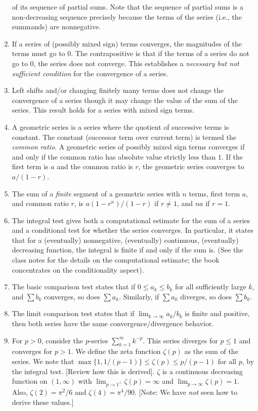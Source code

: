 \documentclass{amsart}
\begin{document}
\begin{enumerate}
  of its sequence of partial sums. Note that the sequence of partial
  sums is a non-decreasing sequence precisely because the terms of the
  series (i.e., the summands) are nonnegative.
\item If a series of (possibly mixed sign) terms converges, the
  magnitudes of the terms must go to $0$. The contrapositive is that
  if the terms of a series do not go to $0$, the series does not
  converge. This establishes a {\em necessary but not sufficient
  condition} for the convergence of a series.
\item Left shifts and/or changing finitely many terms does not change
  the convergence of a series though it may change the value of the
  sum of the series. This result holds for a series with mixed sign
  terms.
\item A geometric series is a series where the quotient of successive
  terms is constant. The constant (successor term over current term)
  is termed the {\em common ratio}. A geometric series of possibly
  mixed sign terms converges if and only if the common ratio has
  absolute value strictly less than $1$. If the first term is $a$ and
  the common ratio is $r$, the geometric series converges to $a/(1 -
  r)$.
\item The sum of a {\em finite} segment of a geometric series with $n$
  terms, first term $a$, and common ratio $r$, is $a(1 - r^n)/(1 - r)$
  if $r \ne 1$, and $na$ if $r = 1$.
\item The integral test gives both a computational estimate for the
  sum of a series and a conditional test for whether the series
  converges. In particular, it states that for a (eventually)
  nonnegative, (eventually) continuous, (eventually) decreasing
  function, the integral is finite if and only if the sum is. (See the
  class notes for the details on the computational estimate; the book
  concentrates on the conditionality aspect).
\item The basic comparison test states that if $0 \le a_k \le b_k$ for
  all sufficiently large $k$, and $\sum b_k$ converges, so does $\sum
  a_k$. Similarly, if $\sum a_k$ diverges, so does $\sum b_k$.
\item The limit comparison test states that if $\lim_{k \to \infty}
  a_k/b_k$ is finite and positive, then both series have the same
  convergence/divergence behavior.
\item For $p > 0$, consider the $p$-series $\sum_{k=1}^\infty
  k^{-p}$. This series diverges for $p \le 1$ and converges for $p >
  1$. We define the zeta function $\zeta(p)$ as the sum of the
  series. We note that $\max \{ 1, 1/(p-1) \} \le \zeta(p) \le
  p/(p-1)$ for all $p$, by the integral test. [Review how this is
  derived]. $\zeta$ is a continuous decreasing function on
  $(1,\infty)$ with $\lim_{p \to 1^+} \zeta(p) = \infty$ and $\lim_{p
  \to \infty} \zeta(p) = 1$. Also, $\zeta(2) = \pi^2/6$ and $\zeta(4)
  = \pi^4/90$. [Note: We have {\em not} seen how to derive these values.]
\end{enumerate}
\end{document}
